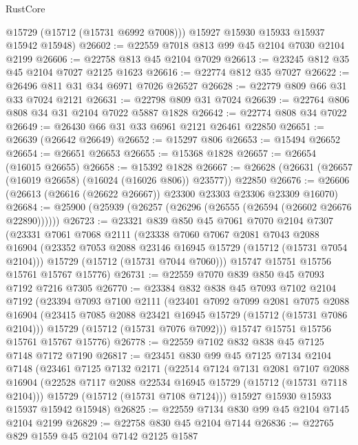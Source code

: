 \begin{lexlean}{RustCore}
\begin{coremodule}
        @15729
        (@15712 (@15731 @6992 @7008)))
      @15927
      @15930
      @15933
      @15937
      @15942
      @15948)
@26602 := @22559 @7018 @813 @99 @45 @2104 @7030 @2104 @2199
@26606 := @22758 @813 @45 @2104 @7029
@26613 := @23245 @812 @35 @45 @2104 @7027 @2125 @1623
@26616 := @22774 @812 @35 @7027
@26622 := @26496 @811 @31 @34 @6971 @7026 @26527
@26628 := @22779 @809 @66 @31 @33 @7024 @2121
@26631 := @22798 @809 @31 @7024
@26639 := @22764 @806 @808 @34 @31 @2104 @7022 @5887 @1828
@26642 := @22774 @808 @34 @7022
@26649 := @26430 @66 @31 @33 @6961 @2121 @26461 @22850
@26651 := @26639 (@26642 @26649)
@26652 := @15297 @806
@26653 := @15494 @26652
@26654 := @26651 @26653
@26655 := @15368 @1828
@26657 := @26654 (@16015 @26655)
@26658 := @15392 @1828
@26667 := @26628 (@26631 (@26657 (@16019 @26658) (@16024 (@16026 @806)) @23577)) @22850
@26676 := @26606 (@26613 (@26616 (@26622 @26667)) @23300 @23303 @23306 @23309 @16070)
@26684 := @25900 (@25939 (@26257 (@26296 (@26555 (@26594 (@26602 @26676 @22890))))))
@26723 := @23321
    @839
    @850
    @45
    @7061
    @7070
    @2104
    @7307
    (@23331
      @7061
      @7068
      @2111
      (@23338
        @7060
        @7067
        @2081
        @7043
        @2088
        @16904
        (@23352 @7053 @2088 @23146 @16945 @15729 (@15712 (@15731 @7054 @2104)))
        @15729
        (@15712 (@15731 @7044 @7060)))
      @15747
      @15751
      @15756
      @15761
      @15767
      @15776)
@26731 := @22559 @7070 @839 @850 @45 @7093 @7192 @7216 @7305
@26770 := @23384
    @832
    @838
    @45
    @7093
    @7102
    @2104
    @7192
    (@23394
      @7093
      @7100
      @2111
      (@23401
        @7092
        @7099
        @2081
        @7075
        @2088
        @16904
        (@23415 @7085 @2088 @23421 @16945 @15729 (@15712 (@15731 @7086 @2104)))
        @15729
        (@15712 (@15731 @7076 @7092)))
      @15747
      @15751
      @15756
      @15761
      @15767
      @15776)
@26778 := @22559 @7102 @832 @838 @45 @7125 @7148 @7172 @7190
@26817 := @23451
    @830
    @99
    @45
    @7125
    @7134
    @2104
    @7148
    (@23461
      @7125
      @7132
      @2171
      (@22514
        @7124
        @7131
        @2081
        @7107
        @2088
        @16904
        (@22528 @7117 @2088 @22534 @16945 @15729 (@15712 (@15731 @7118 @2104)))
        @15729
        (@15712 (@15731 @7108 @7124)))
      @15927
      @15930
      @15933
      @15937
      @15942
      @15948)
@26825 := @22559 @7134 @830 @99 @45 @2104 @7145 @2104 @2199
@26829 := @22758 @830 @45 @2104 @7144
@26836 := @22765 @829 @1559 @45 @2104 @7142 @2125 @1587

\end{coremodule}
\end{lexlean}
